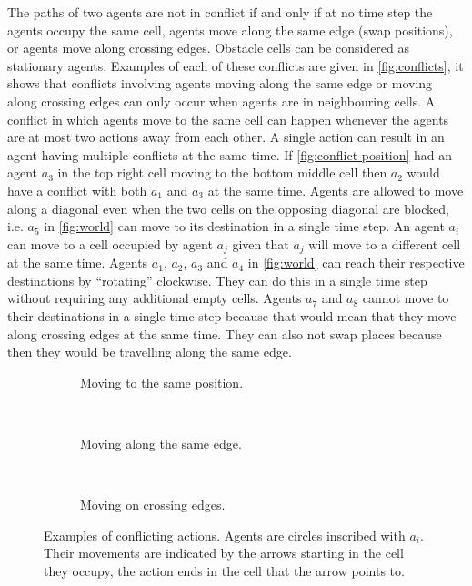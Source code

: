 The paths of two agents are not in conflict if and only if at no time step the 
agents
occupy the same cell, agents move along the same edge (swap positions), or
agents move along crossing edges. Obstacle cells can be considered as
stationary agents. Examples of each of these conflicts are given
in \autoref{fig:conflicts}, it shows that conflicts involving agents moving
along the same edge or moving along crossing edges can only occur when agents
are in neighbouring cells. A conflict in which agents move to the same cell can
happen whenever the agents are at most two actions away from each other. A
single action can result in an agent having multiple conflicts at the same
time. If \autoref{fig:conflict-position} had an agent $a_3$ in the top right
cell moving to the bottom middle cell then $a_2$ would have a conflict with
both $a_1$ and $a_3$ at the same time.
Agents are allowed to move along a diagonal even when the two cells on the
opposing diagonal are blocked, i.e. $a_5$ in \autoref{fig:world} can move to its
destination in a single time step. An agent $a_i$ can move to a cell occupied by
agent $a_j$ given that $a_j$ will move to a different cell at the same time.
Agents $a_1$, $a_2$, $a_3$ and $a_4$ in \autoref{fig:world} can reach their
respective destinations by ``rotating'' clockwise. They can do this in a single
time step without requiring any additional empty cells. Agents $a_7$ and $a_8$
cannot move to their
destinations in a single time step because that would mean that they move along
crossing edges at the same time. They can also not swap places because then
they would be travelling along the same edge.

\begin{figure}[t]
	\centering
	\begin{subfigure}[b]{.3\textwidth}
		\centering
	    \def\svgscale{.7}
		
		\caption{Moving to the same position.}
		\label{fig:conflict-position}
	\end{subfigure}
	~
	\begin{subfigure}[b]{.3\textwidth}
		\centering
	    \def\svgscale{.7}
		
		\caption{Moving along the same edge.}
		\label{fig:conflict-same}
	\end{subfigure}
	~
	\begin{subfigure}[b]{.3\textwidth}
		\centering
  \def\svgscale{.7}
		
		\caption{Moving on crossing edges.}
		\label{fig:conflict-crossing}
	\end{subfigure}
	\caption{Examples of conflicting actions. Agents are circles inscribed with
	$a_i$. Their movements are indicated by the arrows starting in the cell
	they occupy, the action ends in the cell that the arrow points to.}
	\label{fig:conflicts}
\end{figure}